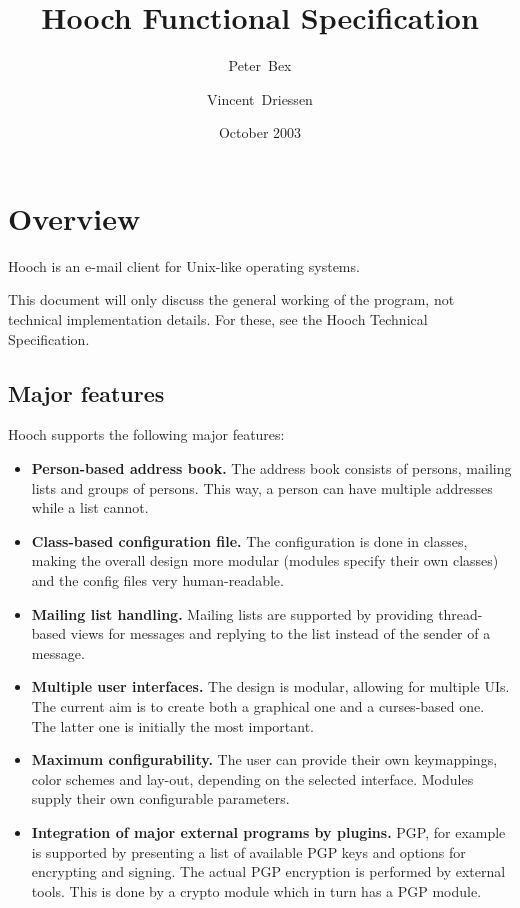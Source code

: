 \documentclass[a4paper]{book}
\title{Hooch Functional Specification}
\date{October 2003}
\author{Peter~Bex\and{}Vincent~Driessen}
\begin{document}
\frontmatter

\maketitle
\tableofcontents


\mainmatter

\chapter{Overview}

Hooch is an e-mail client for Unix-like operating systems.

This document will only discuss the general working of the program, not
technical implementation details. For these, see the Hooch Technical
Specification.


\section{Major features}

Hooch supports the following major features:
\begin{itemize}
\item {\bf Person-based address book.} The address book consists of persons,
	mailing lists and groups of persons. This way, a person can have
	multiple addresses while a list cannot.
\item {\bf Class-based configuration file.} The configuration is done in
	classes, making the overall design more modular (modules specify
	their own classes) and the config files very human-readable.
\item {\bf Mailing list handling.} Mailing lists are supported by providing
	thread-based views for messages and replying to the list instead of
	the sender of a message.
\item {\bf Multiple user interfaces.} The design is modular, allowing for
	multiple UIs. The current aim is to create both a graphical one and
	a curses-based one. The latter one is initially the most important.
\item {\bf Maximum configurability.} The user can provide their own
	keymappings, color schemes and lay-out, depending on the selected
	interface. Modules supply their own configurable parameters.
\item {\bf Integration of major external programs by plugins.} PGP, for example
	is supported by presenting a list of available PGP keys and options for
	encrypting and signing. The actual PGP encryption is performed by
	external tools. This is done by a crypto module which in turn has a
	PGP module.
\end{itemize}
\end{document}
